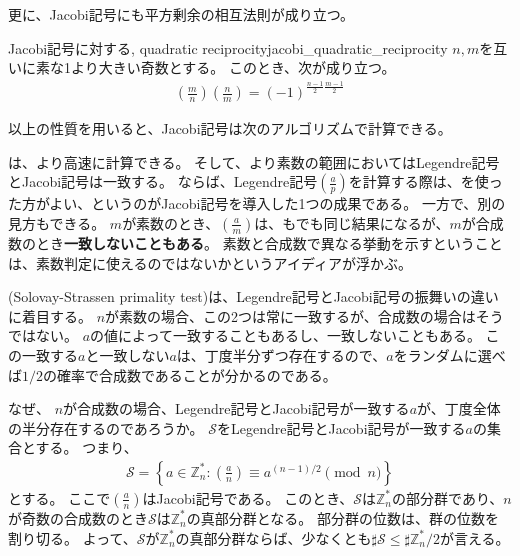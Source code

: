 更に、Jacobi記号にも平方剰余の相互法則が成り立つ。

\begin{Theo}{Jacobi記号に対する, quadratic reciprocity}{jacobi_quadratic_reciprocity}
$n,m$を互いに素な1より大きい奇数とする。
このとき、次が成り立つ。
\begin{align*}
\left(\frac{m}{n}\right)\left(\frac{n}{m}\right) = (-1)^{\frac{n-1}{2}\frac{m-1}{2}}
\end{align*}
\end{Theo}

以上の性質を用いると、Jacobi記号は次のアルゴリズムで計算できる。


は、より高速に計算できる。
そして、より素数の範囲においてはLegendre記号とJacobi記号は一致する。
ならば、Legendre記号$\left(\frac{a}{p}\right)$を計算する際は、を使った方がよい、というのがJacobi記号を導入した1つの成果である。
一方で、別の見方もできる。
$m$が素数のとき、$\left(\frac{a}{m}\right)$は、もでも同じ結果になるが、$m$が合成数のとき\textbf{一致しないこともある}。
素数と合成数で異なる挙動を示すということは、素数判定に使えるのではないかというアイディアが浮かぶ。

(Solovay-Strassen primality test)\cite{DBLP:journals/siamcomp/SolovayS77}は、Legendre記号とJacobi記号の振舞いの違いに着目する。
$n$が素数の場合、この2つは常に一致するが、合成数の場合はそうではない。
$a$の値によって一致することもあるし、一致しないこともある。
この一致する$a$と一致しない$a$は、丁度半分ずつ存在するので、$a$をランダムに選べば$1/2$の確率で合成数であることが分かるのである。


なぜ、 $n$が合成数の場合、Legendre記号とJacobi記号が一致する$a$が、丁度全体の半分存在するのであろうか。
$\mathcal{S}$をLegendre記号とJacobi記号が一致する$a$の集合とする。
つまり、
\begin{align*}
\mathcal{S} = \left\{a \in \mathbb{Z}_n^* : \left(\frac{a}{n}\right) \equiv a^{(n-1)/2} \pmod{n}\right\}
\end{align*}
とする。
ここで$ \left(\frac{a}{n}\right)$はJacobi記号である。
このとき、$\mathcal{S}$は$\mathbb{Z}_n^*$の部分群であり、$n$が奇数の合成数のとき$\mathcal{S}$は$\mathbb{Z}_n^*$の真部分群となる。
部分群の位数は、群の位数を割り切る。
よって、$\mathcal{S}$が$\mathbb{Z}_n^*$の真部分群ならば、少なくとも$\sharp\mathcal{S}\le\sharp\mathbb{Z}_n^*/2$が言える。

